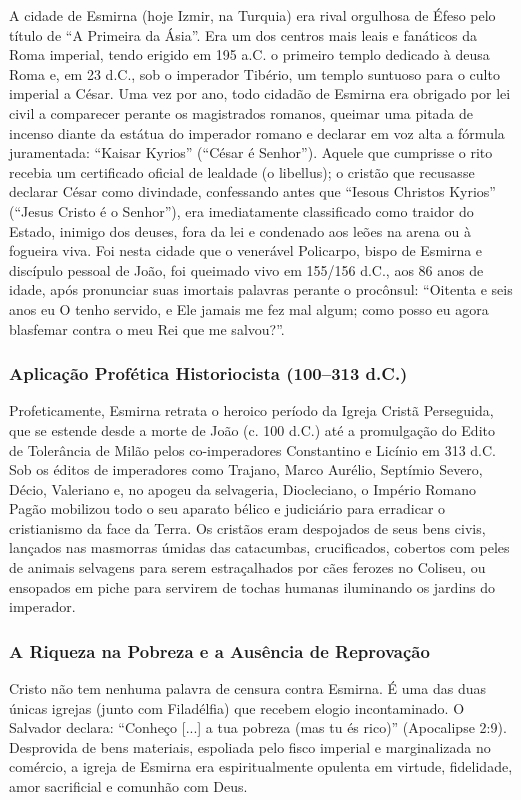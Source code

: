 A cidade de Esmirna (hoje Izmir, na Turquia) era rival orgulhosa de Éfeso pelo título de ``A Primeira da Ásia''. Era um dos centros mais leais e fanáticos da Roma imperial, tendo erigido em 195 a.C. o primeiro templo dedicado à deusa Roma e, em 23 d.C., sob o imperador Tibério, um templo suntuoso para o culto imperial a César. Uma vez por ano, todo cidadão de Esmirna era obrigado por lei civil a comparecer perante os magistrados romanos, queimar uma pitada de incenso diante da estátua do imperador romano e declarar em voz alta a fórmula juramentada: ``Kaisar Kyrios'' (``César é Senhor''). Aquele que cumprisse o rito recebia um certificado oficial de lealdade (o libellus); o cristão que recusasse declarar César como divindade, confessando antes que ``Iesous Christos Kyrios'' (``Jesus Cristo é o Senhor''), era imediatamente classificado como traidor do Estado, inimigo dos deuses, fora da lei e condenado aos leões na arena ou à fogueira viva. Foi nesta cidade que o venerável Policarpo, bispo de Esmirna e discípulo pessoal de João, foi queimado vivo em 155/156 d.C., aos 86 anos de idade, após pronunciar suas imortais palavras perante o procônsul: ``Oitenta e seis anos eu O tenho servido, e Ele jamais me fez mal algum; como posso eu agora blasfemar contra o meu Rei que me salvou?''.


\subsubsection*{Aplicação Profética Historiocista (100–313 d.C.)}
Profeticamente, Esmirna retrata o heroico período da Igreja Cristã Perseguida, que se estende desde a morte de João (c. 100 d.C.) até a promulgação do Edito de Tolerância de Milão pelos co-imperadores Constantino e Licínio em 313 d.C. Sob os éditos de imperadores como Trajano, Marco Aurélio, Septímio Severo, Décio, Valeriano e, no apogeu da selvageria, Diocleciano, o Império Romano Pagão mobilizou todo o seu aparato bélico e judiciário para erradicar o cristianismo da face da Terra. Os cristãos eram despojados de seus bens civis, lançados nas masmorras úmidas das catacumbas, crucificados, cobertos com peles de animais selvagens para serem estraçalhados por cães ferozes no Coliseu, ou ensopados em piche para servirem de tochas humanas iluminando os jardins do imperador.


\subsubsection*{A Riqueza na Pobreza e a Ausência de Reprovação}
Cristo não tem nenhuma palavra de censura contra Esmirna. É uma das duas únicas igrejas (junto com Filadélfia) que recebem elogio incontaminado. O Salvador declara: ``Conheço [...] a tua pobreza (mas tu és rico)'' (Apocalipse 2:9). Desprovida de bens materiais, espoliada pelo fisco imperial e marginalizada no comércio, a igreja de Esmirna era espiritualmente opulenta em virtude, fidelidade, amor sacrificial e comunhão com Deus.

